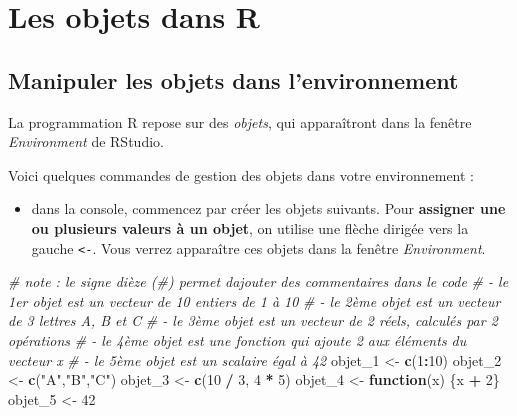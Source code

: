 \documentclass[
]{book}
\newenvironment{Shaded}{\begin{snugshade}}{\end{snugshade}}
\newcommand{\CommentTok}[1]{\textcolor[rgb]{0.56,0.35,0.01}{\textit{#1}}}
\newcommand{\ControlFlowTok}[1]{\textcolor[rgb]{0.13,0.29,0.53}{\textbf{#1}}}
\newcommand{\DecValTok}[1]{\textcolor[rgb]{0.00,0.00,0.81}{#1}}
\newcommand{\FunctionTok}[1]{\textcolor[rgb]{0.13,0.29,0.53}{\textbf{#1}}}
\newcommand{\NormalTok}[1]{#1}
\newcommand{\OtherTok}[1]{\textcolor[rgb]{0.56,0.35,0.01}{#1}}
\newcommand{\SpecialCharTok}[1]{\textcolor[rgb]{0.81,0.36,0.00}{\textbf{#1}}}
\newcommand{\StringTok}[1]{\textcolor[rgb]{0.31,0.60,0.02}{#1}}
\providecommand{\tightlist}{%
  \setlength{\itemsep}{0pt}\setlength{\parskip}{0pt}}
\begin{document}
\chapter{Les objets dans R}\label{les-objets-dans-r}

\section{Manipuler les objets dans l'environnement}\label{manipuler-les-objets-dans-lenvironnement}

La programmation R repose sur des \emph{objets}, qui apparaîtront dans la fenêtre \emph{Environment} de RStudio.

Voici quelques commandes de gestion des objets dans votre environnement :

\begin{itemize}
\tightlist
\item
  dans la console, commencez par créer les objets suivants. Pour \textbf{assigner une ou plusieurs valeurs à un objet}, on utilise une flèche dirigée vers la gauche \texttt{\textless{}-}. Vous verrez apparaître ces objets dans la fenêtre \emph{Environment}.
\end{itemize}

\begin{Shaded}
\begin{Highlighting}[]
\CommentTok{\# note : le signe dièze (\#) permet d\textquotesingle{}ajouter des commentaires dans le code  }
\CommentTok{\# {-} le 1er objet est un vecteur de 10 entiers de 1 à 10}
\CommentTok{\# {-} le 2ème objet est un vecteur de 3 lettres A, B et C}
\CommentTok{\# {-} le 3ème objet est un vecteur de 2 réels, calculés par 2 opérations}
\CommentTok{\# {-} le 4ème objet est une fonction qui ajoute 2 aux éléments du vecteur x}
\CommentTok{\# {-} le 5ème objet est un scalaire égal à 42}
\NormalTok{objet\_1 }\OtherTok{\textless{}{-}} \FunctionTok{c}\NormalTok{(}\DecValTok{1}\SpecialCharTok{:}\DecValTok{10}\NormalTok{) }
\NormalTok{objet\_2 }\OtherTok{\textless{}{-}} \FunctionTok{c}\NormalTok{(}\StringTok{"A"}\NormalTok{,}\StringTok{"B"}\NormalTok{,}\StringTok{"C"}\NormalTok{) }
\NormalTok{objet\_3 }\OtherTok{\textless{}{-}} \FunctionTok{c}\NormalTok{(}\DecValTok{10} \SpecialCharTok{/} \DecValTok{3}\NormalTok{, }\DecValTok{4} \SpecialCharTok{*} \DecValTok{5}\NormalTok{) }
\NormalTok{objet\_4 }\OtherTok{\textless{}{-}} \ControlFlowTok{function}\NormalTok{(x) \{x }\SpecialCharTok{+} \DecValTok{2}\NormalTok{\} }
\NormalTok{objet\_5 }\OtherTok{\textless{}{-}} \DecValTok{42} 
\end{Highlighting}
\end{Shaded}
\end{document}
